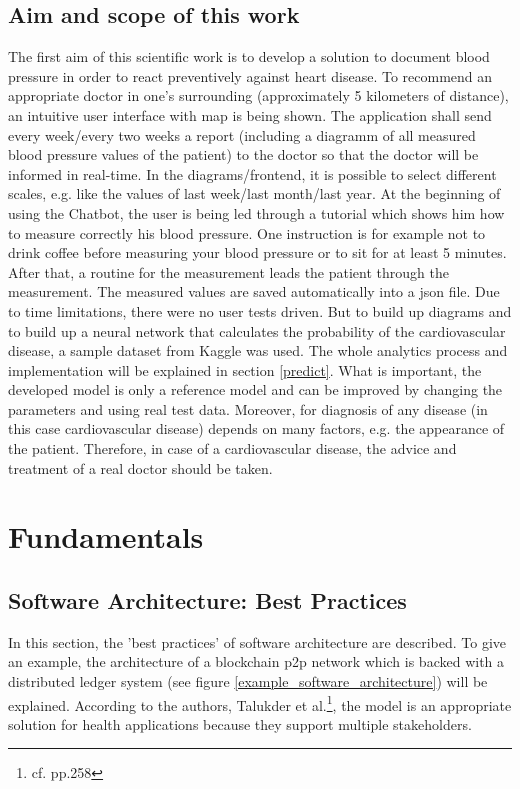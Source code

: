 \section{Aim and scope of this work}
The first aim of this scientific work is to develop a solution to document blood pressure in order to react preventively against heart disease.
To recommend an appropriate doctor in one's surrounding (approximately 5 kilometers of distance), an intuitive user interface with map is being shown.
The application shall send every week/every two weeks a report (including a diagramm of all measured blood pressure values of the patient) to the doctor so that the doctor will be informed in real-time. In the diagrams/frontend, it is possible to select different scales, e.g. like the values of last week/last month/last year. 
At the beginning of using the Chatbot, the user is being led through a tutorial which shows him how to measure correctly his blood pressure. One instruction is for example not to drink coffee before measuring your blood pressure or to sit for at least 5 minutes. After that, a routine for the measurement leads the patient through the measurement. The measured values are saved automatically into a \ac{json} file.
Due to time limitations, there were no user tests driven. But to build up diagrams and to build up a neural network that calculates the probability of the cardiovascular disease, a sample dataset from Kaggle was used. The whole analytics process and implementation will be explained in section \ref{predict}. What is important, the developed model is only a reference model and can be improved by changing the parameters and using real test data. Moreover, for diagnosis of any disease (in this case cardiovascular disease) depends on many factors, e.g. the appearance of the patient. Therefore, in case of a cardiovascular disease, the advice and treatment of a real doctor should be taken.

\chapter{Fundamentals}\label{fundamentals}

\section{Software Architecture: Best Practices}

In this section, the 'best practices' of software architecture are described. To give an example, the architecture of a blockchain \ac{p2p} network which is backed with a distributed ledger system (see figure \ref{example_software_architecture}) will be explained. According to the authors, Talukder et al.\footnote{cf.\autocite{talukder} pp.258}, the model is an appropriate solution for health applications because they support multiple stakeholders.


